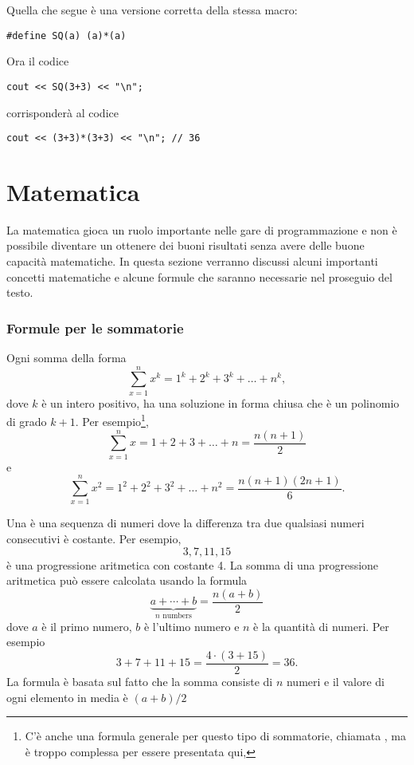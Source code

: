 Quella che segue è una versione corretta della stessa macro:
\begin{lstlisting}
#define SQ(a) (a)*(a)
\end{lstlisting}
Ora il codice
\begin{lstlisting}
cout << SQ(3+3) << "\n";
\end{lstlisting}
corrisponderà al codice
\begin{lstlisting}
cout << (3+3)*(3+3) << "\n"; // 36
\end{lstlisting}


\section{Matematica}

La matematica gioca un ruolo importante 
nelle gare di programmazione e non è possibile 
diventare un ottenere dei buoni risultati
senza avere delle buone capacità matematiche.
In questa sezione verranno discussi alcuni 
importanti concetti matematiche e alcune formule 
che saranno necessarie nel proseguio del testo.

\subsubsection{Formule per le sommatorie}

Ogni somma della forma
\[\sum_{x=1}^n x^k = 1^k+2^k+3^k+\ldots+n^k,\]
dove $k$ è un intero positivo, ha una soluzione in forma chiusa
che è un polinomio di grado $k+1$.
Per esempio\footnote{
C'è anche una formula generale per questo tipo di sommatorie, chiamata ,
ma è troppo complessa per essere presentata qui,},
\[\sum_{x=1}^n x = 1+2+3+\ldots+n = \frac{n(n+1)}{2}\]
e
\[\sum_{x=1}^n x^2 = 1^2+2^2+3^2+\ldots+n^2 = \frac{n(n+1)(2n+1)}{6}.\]

Una  è una 
sequenza di numeri
dove la differenza tra due qualsiasi numeri consecutivi è costante.
Per esempio,
\[3, 7, 11, 15\]
è una progressione aritmetica con costante 4.
La somma di una progressione aritmetica può essere calcolata
usando la formula
\[\underbrace{a + \cdots + b}_{n \,\, \textrm{numbers}} = \frac{n(a+b)}{2}\]
dove $a$ è il primo numero,
$b$ è l'ultimo numero e 
$n$ è la quantità di numeri.
Per esempio
\[3+7+11+15=\frac{4 \cdot (3+15)}{2} = 36.\]
La formula è basata sul fatto che 
la somma consiste di $n$ numeri e il valore di
ogni elemento in media è $(a+b)/2$

